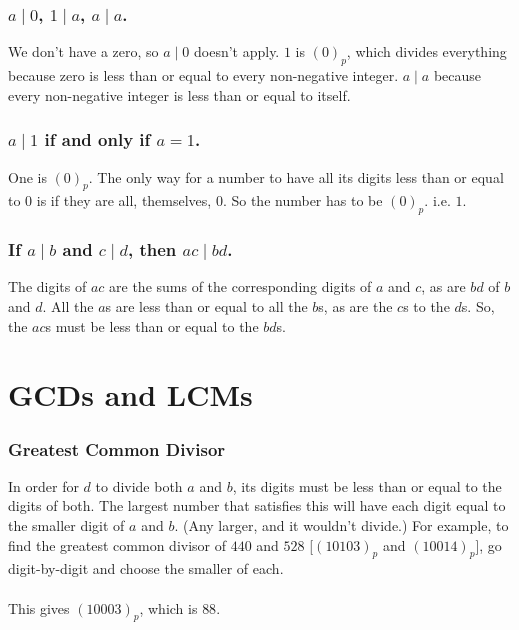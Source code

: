 \documentclass[12pt]{article}
\newcommand{\ppn}[1]{(#1)_p}
\begin{document}
\subsubsection*{$a \mid 0$, $1 \mid a$, $a \mid a$.}
We don't have a zero, so $a \mid 0$ doesn't apply. $1$ is $\ppn{0}$, which divides everything because zero is less than or equal to every non-negative integer. $a \mid a$ because every non-negative integer is less than or equal to itself.

\subsubsection*{$a \mid 1$ if and only if $a = 1$.}
One is $\ppn{0}$. The only way for a number to have all its digits less than or equal to $0$ is if they are all, themselves, $0$. So the number has to be $\ppn{0}$. i.e. $1$.

\subsubsection*{If $a \mid b$ and $c \mid d$, then $ac \mid bd$.}
The digits of $ac$ are the sums of the corresponding digits of $a$ and $c$, as are $bd$ of $b$ and $d$. All the $a$s are less than or equal to all the $b$s, as are the $c$s to the $d$s. So, the $ac$s must be less than or equal to the $bd$s.

\section*{GCDs and LCMs}
\subsubsection*{Greatest Common Divisor}
In order for $d$ to divide both $a$ and $b$, its digits must be less than or equal to the digits of both. The largest number that satisfies this will have each digit equal to the smaller digit of $a$ and $b$. (Any larger, and it wouldn't divide.) For example, to find the greatest common divisor of $440$ and $528$ [$\ppn{10103}$ and $\ppn{10014}$], go digit-by-digit and choose the smaller of each.\\
\ttfamily \small
{}
\normalfont \normalsize \\
This gives $\ppn{10003}$, which is $88$.
\end{document}
